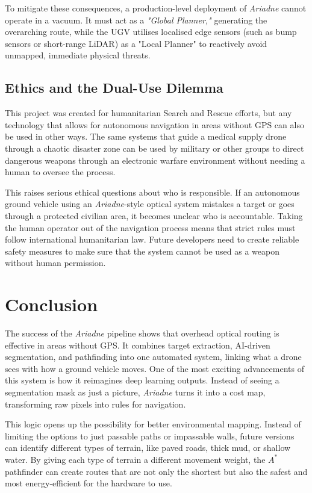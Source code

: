 \documentclass[12pt, a4paper]{article}
\begin{document}
\hspace{-1.5em}To mitigate these consequences, a production-level deployment of \textit{Ariadne} cannot operate in a vacuum. It must act as a \textit{"Global Planner,"} generating the overarching route, while the UGV utilises localised edge sensors (such as bump sensors or short-range LiDAR) as a "Local Planner" to reactively avoid unmapped, immediate physical threats.

\vspace{0.5cm}

\subsection{Ethics and the Dual-Use Dilemma}

\quad This project was created for humanitarian Search and Rescue efforts, but any technology that allows for autonomous navigation in areas without GPS can also be used in other ways. The same systems that guide a medical supply drone through a chaotic disaster zone can be used by military or other groups to direct dangerous weapons through an electronic warfare environment without needing a human to oversee the process.

\vspace{0.5cm}

This raises serious ethical questions about who is responsible. If an autonomous ground vehicle using an \textit{Ariadne}-style optical system mistakes a target or goes through a protected civilian area, it becomes unclear who is accountable. Taking the human operator out of the navigation process means that strict rules must follow international humanitarian law. Future developers need to create reliable safety measures to make sure that the system cannot be used as a weapon without human permission.

\section{Conclusion}

\quad The success of the \textit{Ariadne} pipeline shows that overhead optical routing is effective in areas without GPS. It combines target extraction, AI-driven segmentation, and pathfinding into one automated system, linking what a drone sees with how a ground vehicle moves. One of the most exciting advancements of this system is how it reimagines deep learning outputs. Instead of seeing a segmentation mask as just a picture, \textit{Ariadne} turns it into a cost map, transforming raw pixels into rules for navigation.

\vspace{0.5cm}

This logic opens up the possibility for better environmental mapping. Instead of limiting the options to just passable paths or impassable walls, future versions can identify different types of terrain, like paved roads, thick mud, or shallow water. By giving each type of terrain a different movement weight, the $A^*$ pathfinder can create routes that are not only the shortest but also the safest and most energy-efficient for the hardware to use.

\clearpage


    
\end{document}
